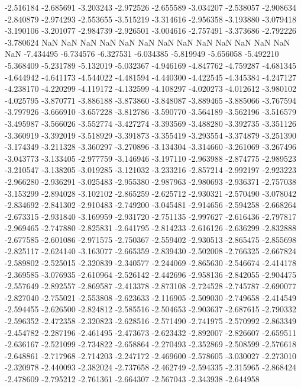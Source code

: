 -2.516184
-2.685691
-3.203243
-2.972526
-2.655589
-3.034207
-2.538057
-2.908634
-2.840879
-2.974293
-2.553655
-3.515219
-3.314616
-2.956358
-3.193880
-3.079418
-3.190106
-3.201077
-2.984739
-2.926501
-3.004616
-2.757491
-3.373686
-2.792226
-3.780624
NaN
NaN
NaN
NaN
NaN
NaN
NaN
NaN
NaN
NaN
NaN
NaN
NaN
NaN
-7.434495
-6.734576
-6.327531
-6.034385
-5.819949
-5.656058
-5.492210
-5.368409
-5.231789
-5.132019
-5.032367
-4.946169
-4.847762
-4.759287
-4.681345
-4.644942
-4.641173
-4.544022
-4.481594
-4.440300
-4.422545
-4.345384
-4.247127
-4.238170
-4.220299
-4.119172
-4.132599
-4.108297
-4.020273
-4.012612
-3.980102
-4.025795
-3.870771
-3.886188
-3.873860
-3.848087
-3.889465
-3.885066
-3.767594
-3.797926
-3.666910
-3.657228
-3.812786
-3.590770
-3.564189
-3.562196
-3.516579
-3.495987
-3.566026
-3.552774
-3.427274
-3.393569
-3.488280
-3.392735
-3.351126
-3.360919
-3.392019
-3.518929
-3.391873
-3.355419
-3.293554
-3.374879
-3.251390
-3.174349
-3.211328
-3.360297
-3.270896
-3.134304
-3.314660
-3.261069
-3.267496
-3.043773
-3.133405
-2.977759
-3.146946
-3.197110
-2.963988
-2.874775
-2.989523
-3.210547
-3.138205
-3.019285
-3.121032
-3.233216
-2.857214
-2.992197
-2.923223
-2.966280
-2.936291
-3.025483
-2.955380
-2.987963
-2.980693
-2.936371
-2.757038
-3.153299
-2.894028
-3.102102
-2.865259
-2.625712
-2.930321
-2.570490
-3.078042
-2.834692
-2.841302
-2.910483
-2.749200
-3.045481
-2.914656
-2.594258
-2.668264
-2.673315
-2.931840
-3.169959
-2.931720
-2.751135
-2.997627
-2.616436
-2.797817
-2.969465
-2.747880
-2.825831
-2.641795
-2.814233
-2.616126
-2.636299
-2.832888
-2.677585
-2.601086
-2.971575
-2.750367
-2.559402
-2.930513
-2.865475
-2.855698
-2.825117
-2.624140
-3.163077
-2.665359
-2.839430
-2.502008
-2.766325
-2.667824
-2.589802
-2.525015
-2.320839
-2.340577
-2.244069
-2.865630
-2.546674
-2.414178
-2.369585
-3.076935
-2.610964
-2.526142
-2.442696
-2.958136
-2.842055
-2.904475
-2.557649
-2.892557
-2.869587
-2.413378
-2.873108
-2.724528
-2.745787
-2.690077
-2.827040
-2.755021
-2.553808
-2.623633
-2.116905
-2.509030
-2.749658
-2.414549
-2.594455
-2.626500
-2.824812
-2.585516
-2.504653
-2.903637
-2.687615
-2.790332
-2.596352
-2.472358
-2.320823
-2.628516
-2.571490
-2.741975
-2.570992
-2.863349
-2.454782
-2.287196
-2.461495
-2.473673
-2.623432
-2.892007
-2.826607
-2.659511
-2.636167
-2.521099
-2.734822
-2.658864
-2.270493
-2.352869
-2.508599
-2.576618
-2.648861
-2.717968
-2.714203
-2.247172
-2.469600
-2.578605
-3.030027
-2.273010
-2.320978
-2.440093
-2.382024
-2.737658
-2.462749
-2.594335
-2.315965
-2.868424
-2.478609
-2.795212
-2.761361
-2.664307
-2.567043
-2.343938
-2.644958
